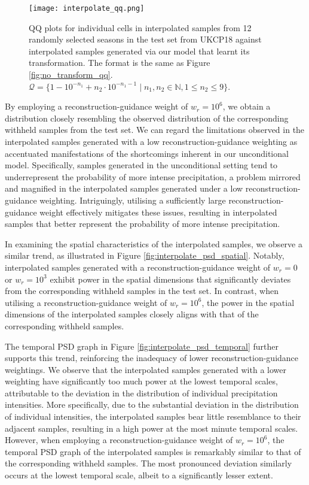 \documentclass[ oneside,%
                    author={George Herbert},
                    degree={MSci},
                     title={Diffusion Models for Time-Evolving Precipitation Fields},
                  subtitle={}]{dissertation}
\begin{document}
\begin{figure}[htbp]
      \centering
      \texttt{[image: interpolate\_qq.png]}
      \caption{QQ plots for individual cells in interpolated samples from 12 randomly selected seasons in the test set from UKCP18 against interpolated samples generated via our model that learnt its transformation. The format is the same as Figure \ref{fig:no_transform_qq}. $\mathcal{Q} = \{1 - 10^{-n_1} + n_2 \cdot 10^{-n_1 - 1}\mid n_1,n_2\in \mathbb{N}, 1 \le n_2 \le 9\}$.}
      \label{fig:interpolate_qq}
\end{figure}

By employing a reconstruction-guidance weight of $w_r=10^6$, we obtain a distribution closely resembling the observed distribution of the corresponding withheld samples from the test set. We can regard the limitations observed in the interpolated samples generated with a low reconstruction-guidance weighting as accentuated manifestations of the shortcomings inherent in our unconditional model. Specifically, samples generated in the unconditional setting tend to underrepresent the probability of more intense precipitation, a problem mirrored and magnified in the interpolated samples generated under a low reconstruction-guidance weighting. Intriguingly, utilising a sufficiently large reconstruction-guidance weight effectively mitigates these issues, resulting in interpolated samples that better represent the probability of more intense precipitation.

In examining the spatial characteristics of the interpolated samples, we observe a similar trend, as illustrated in Figure \ref{fig:interpolate_psd_spatial}. Notably, interpolated samples generated with a reconstruction-guidance weight of $w_r=0$ or $w_r=10^3$ exhibit power in the spatial dimensions that significantly deviates from the corresponding withheld samples in the test set. In contrast, when utilising a reconstruction-guidance weight of $w_r=10^6$, the power in the spatial dimensions of the interpolated samples closely aligns with that of the corresponding withheld samples.

The temporal PSD graph in Figure \ref{fig:interpolate_psd_temporal} further supports this trend, reinforcing the inadequacy of lower reconstruction-guidance weightings. We observe that the interpolated samples generated with a lower weighting have significantly too much power at the lowest temporal scales, attributable to the deviation in the distribution of individual precipitation intensities. More specifically, due to the substantial deviation in the distribution of individual intensities, the interpolated samples bear little resemblance to their adjacent samples, resulting in a high power at the most minute temporal scales. However, when employing a reconstruction-guidance weight of $w_r=10^6$, the temporal PSD graph of the interpolated samples is remarkably similar to that of the corresponding withheld samples. The most pronounced deviation similarly occurs at the lowest temporal scale, albeit to a significantly lesser extent.
\end{document}
